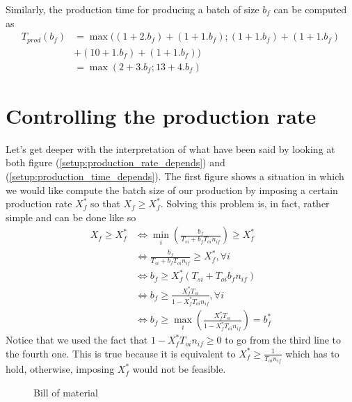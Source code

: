 Similarly, the production time for producing a batch of size $b_f$ can be computed as
\[
    \begin{split}
        T_{prod}(b_f) &= \max( (1+2.b_f) + (1 + 1.b_f) ; (1+1.b_f) + (1 + 1.b_f)\\&+ (10 + 1.b_f)+ (1 + 1.b_f) )\\
        &= \max(2+3.b_f ; 13 + 4.b_f)
    \end{split}
\]

\section{Controlling the production rate}

Let's get deeper with the interpretation of what have been said by looking at both figure (\ref{setup:production_rate_depends}) and (\ref{setup:production_time_depends}). The first figure shows a situation in which we would like compute the batch size of our production by imposing a certain production rate $X_f^*$ so that $X_f\ge X_f^*$. Solving this problem is, in fact, rather simple and can be done like so
\[
    \begin{split}
        X_f\ge X_f^* &\Leftrightarrow \min_i\left( \frac{b_f}{T_{si} + b_fT_{oi}n_{if}} \right) \ge X_f^*\\
            &\Leftrightarrow \frac{b_f}{T_{si} + b_fT_{oi}n_{if}} \ge X_f^*, \forall i\\
            &\Leftrightarrow b_f \ge X_f^*( T_{si} + T_{oi}b_fn_{if} )\\
            &\Leftrightarrow b_f \ge \frac{ X_f^*T_{si} }{ 1 - X_f^*T_{oi}n_{if} }, \forall i\\
            &\Leftrightarrow b_f \ge \max_i\left( \frac{ X_f^*T_{si} }{ 1 - X_f^*T_{oi}n_{if} } \right) = b_f^*
    \end{split}
\]
Notice that we used the fact that $1-X_f^*T_{oi}n_{if} \ge 0$ to go from the third line to the fourth one. This is true because it is equivalent to $ X_f^*\ge\frac{1}{T_{oi}n_{if}} $ which has to hold, otherwise, imposing $X_f^*$ would not be feasible. 

\begin{wrapfigure}[14]{l}{5cm}
    \centering
    \caption{\label{setup:bill_of_mat2}Bill of material}
\end{wrapfigure}

